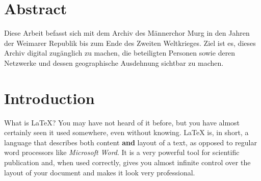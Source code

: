 \documentclass[
  12pt,
  a4paper,
]{article}
\renewcommand*\contentsname{Inhaltsverzeichnis}
\newcommand\contentsname{Inhaltsverzeichnis}
\begin{document}
\section*{Abstract}

Diese Arbeit befasst sich mit dem Archiv des Männerchor Murg in den Jahren der Weimarer Republik bis zum Ende des Zweiten Weltkrieges. Ziel ist es, dieses Archiv digital zugänglich zu machen, die beteiligten Personen sowie deren Netzwerke und dessen geographische Ausdehnung sichtbar zu machen.








\renewcommand*\contentsname{Table of Contents} %
{
\hypersetup{linkcolor=}
\setcounter{tocdepth}{5} %
\tableofcontents
}
\newpage
{} %



\section{Introduction}

What is LaTeX? You may have not heard of it before, but you have almost certainly seen it used somewhere, even without knowing. LaTeX is, in short, a language that describes both content \textbf{and} layout of a text, as opposed to regular word processors like \emph{Microsoft Word}. It is a very powerful tool for scientific publication and, when used correctly, gives you almost infinite control over the layout of your document and makes it look very professional.
\end{document}

